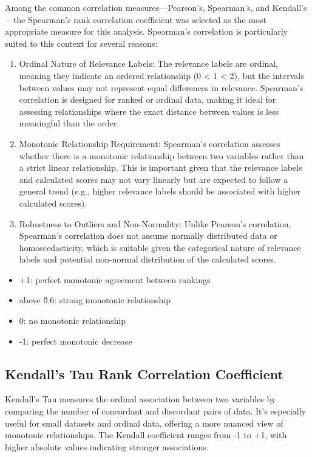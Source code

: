 Among the common correlation measures—Pearson's, Spearman's, and Kendall's—the Spearman's rank correlation coefficient was selected as the most appropriate measure for this analysis. Spearman's correlation is particularly suited to this context for several reasons:

\begin{enumerate}
    \item Ordinal Nature of Relevance Labels: The relevance labels are ordinal, meaning they indicate an ordered relationship (0 < 1 < 2), but the intervals between values may not represent equal differences in relevance. Spearman's correlation is designed for ranked or ordinal data, making it ideal for assessing relationships where the exact distance between values is less meaningful than the order.
    \item Monotonic Relationship Requirement: Spearman's correlation assesses whether there is a monotonic relationship between two variables rather than a strict linear relationship. This is important given that the relevance labels and calculated scores may not vary linearly but are expected to follow a general trend (e.g., higher relevance labels should be associated with higher calculated scores).
    \item Robustness to Outliers and Non-Normality: Unlike Pearson's correlation, Spearman's correlation does not assume normally distributed data or homoscedasticity, which is suitable given the categorical nature of relevance labels and potential non-normal distribution of the calculated scores.
\end{enumerate}

\begin{itemize}
    \item +1: perfect monotonic agreement between rankings
    \item above \~ 0.6: strong monotonic relationship
    \item 0: no monotonic relationship
    \item -1: perfect monotonic decrease
\end{itemize}

\subsection{Kendall's Tau Rank Correlation Coefficient}\label{kendalls-tau-rank-correlation-coefficient}

Kendall's Tau measures the ordinal association between two variables by comparing the number of concordant and discordant pairs of data. It's especially useful for small datasets and ordinal data, offering a more nuanced view of monotonic relationships. The Kendall coefficient ranges from -1 to +1, with higher absolute values indicating stronger associations.

